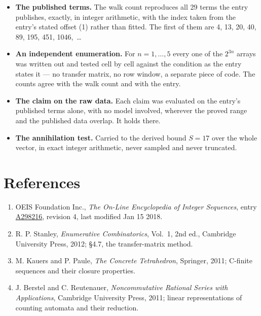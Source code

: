 \documentclass[11pt]{article}
\theoremstyle{definition}
\begin{document}
\begin{itemize}

\item {\bfseries The published terms.} The walk count reproduces all 29 terms the entry publishes, exactly, in integer arithmetic, with the index taken from the entry's stated offset (1) rather than fitted. The first of them are 4, 13, 20, 40, 89, 195, 451, 1046,~\dots

\item {\bfseries An independent enumeration.} For $n = 1,\dots,5$ every one of the $2^{3n}$ arrays was written out and tested cell by cell against the condition as the entry states it --- no transfer matrix, no row window, a separate piece of code. The counts agree with the walk count and with the entry.

\item {\bfseries The claim on the raw data.} Each claim was evaluated on the entry's published terms alone, with no model involved, wherever the proved range and the published data overlap. It holds there.

\item {\bfseries The annihilation test.} Carried to the derived bound $S = 17$ over the whole vector, in exact integer arithmetic, never sampled and never truncated.

\end{itemize}

\section{References}

\begin{enumerate}

\item OEIS Foundation Inc., \emph{The On-Line Encyclopedia of Integer Sequences}, entry \href{https://oeis.org/A298216}{A298216}, revision 4, last modified Jan 15 2018.

\item R. P. Stanley, \emph{Enumerative Combinatorics}, Vol.~1, 2nd ed., Cambridge University Press, 2012; \S4.7, the transfer-matrix method.

\item M. Kauers and P. Paule, \emph{The Concrete Tetrahedron}, Springer, 2011; C-finite sequences and their closure properties.

\item J. Berstel and C. Reutenauer, \emph{Noncommutative Rational Series with Applications}, Cambridge University Press, 2011; linear representations of counting automata and their reduction.

\end{enumerate}
\end{document}

